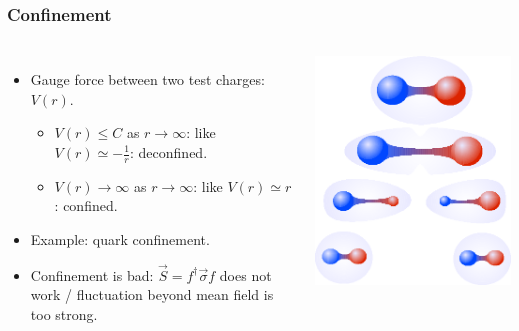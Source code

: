 \documentclass[xcolor=table, 10pt, aspectratio=169]{beamer}
\begin{document}
\begin{frame}
  \frametitle{Confinement}
  \begin{columns}
    \begin{itemize}
      \item Gauge force between two test charges: $V(r)$.
      \begin{itemize}
        \item $V(r)\leq C$ as $r\rightarrow \infty$: like $V(r)\simeq -\frac1r$: deconfined.
        \item $V(r)\rightarrow\infty$ as $r\rightarrow \infty$: like $V(r)\simeq r$: confined.
      \end{itemize}
      \item Example: quark confinement.
      \item Confinement is bad:
      $\vec S=f^\dagger \vec\sigma f$ does not work / fluctuation beyond mean field is too strong.
    \end{itemize}
    \begin{center}
      \includegraphics[width=.8\textwidth]{QCD-confinement}
    \end{center}
  \end{columns}
\end{frame}
\end{document}
